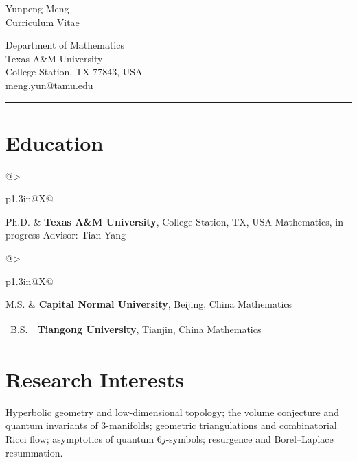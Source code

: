 \documentclass[11pt]{article}
\makeatletter
\newcommand{\cventry}[2]{%
  \begin{tabularx}{\linewidth}{@{}>{\raggedright\arraybackslash}p{1.3in}@{}X@{}}
    \textcolor{muted}{#1} & #2
  \end{tabularx}\par\vspace{0.4em}}
\makeatother
\begin{document}
\begin{minipage}[b]{0.56\linewidth}
  {\fontsize{25}{29}\selectfont Yunpeng Meng}\\[4pt]
  {\large\color{muted}Curriculum Vitae}
\end{minipage}\hfill
\begin{minipage}[b]{0.42\linewidth}\raggedleft\small
  Department of Mathematics\\
  Texas A\&M University\\
  College Station, TX 77843, USA\\
  \href{mailto:meng.yun@tamu.edu}{meng.yun@tamu.edu}
\end{minipage}

\vspace{6pt}
{\color{accent}\rule{\linewidth}{0.9pt}}

\section{Education}
\cventry{Ph.D.}{\textbf{Texas A\&M University}, College Station, TX, USA\newline
  Mathematics, in progress\newline
  Advisor: Tian Yang}
\cventry{M.S.}{\textbf{Capital Normal University}, Beijing, China\newline
  Mathematics}
\cventry{B.S.}{\textbf{Tiangong University}, Tianjin, China\newline
  Mathematics}

\section{Research Interests}
Hyperbolic geometry and low-dimensional topology; the volume conjecture and quantum invariants of 3-manifolds;
geometric triangulations and combinatorial Ricci flow; asymptotics of quantum $6j$-symbols;
resurgence and Borel--Laplace resummation.
\end{document}
